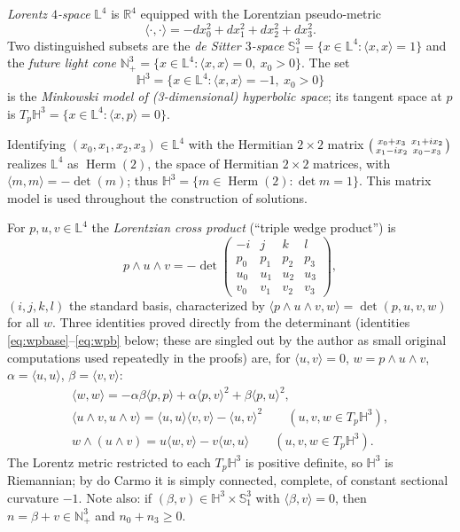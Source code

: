 \documentclass[11pt,a4paper]{article}
\newcommand{\RR}{\mathbb{R}}
\newcommand{\Hyp}{\mathbb{H}^3}                      %
\newcommand{\Lor}{\mathbb{L}^4}                      %
\newcommand{\deS}{\mathbb{S}^3_1}                    %
\newcommand{\LCone}{\mathbb{N}^3_+}                  %
\newcommand{\Herm}{\operatorname{Herm}(2)}
\newcommand{\ip}[2]{\langle #1,#2\rangle}            %
\theoremstyle{plain}
\theoremstyle{definition}
\theoremstyle{remark}
\begin{document}
\emph{Lorentz $4$-space} $\Lor$ is $\RR^4$ equipped with the Lorentzian
pseudo-metric
\begin{equation}
  \ip{\cdot}{\cdot} = -dx_0^2+dx_1^2+dx_2^2+dx_3^2 .
\end{equation}
Two distinguished subsets are the \emph{de Sitter $3$-space}
$\deS=\{x\in\Lor : \ip xx=1\}$ and the \emph{future light cone}
$\LCone=\{x\in\Lor : \ip xx=0,\ x_0>0\}$. The set
\[
  \Hyp = \{x\in\Lor : \ip xx=-1,\ x_0>0\}
\]
is the \emph{Minkowski model of (3-dimensional) hyperbolic space}; its
tangent space at $p$ is $T_p\Hyp=\{x\in\Lor:\ip xp=0\}$.

Identifying $(x_0,x_1,x_2,x_3)\in\Lor$ with the Hermitian $2\times2$ matrix
$\begin{psmallmatrix}x_0+x_3 & x_1+ix_2\\ x_1-ix_2 & x_0-x_3\end{psmallmatrix}$
realizes $\Lor$ as $\Herm$, the space of Hermitian $2\times2$ matrices,
with $\ip mm=-\det(m)$; thus $\Hyp=\{m\in\Herm:\det m=1\}$. This
matrix model is used throughout the construction of solutions.

For $p,u,v\in\Lor$ the \emph{Lorentzian cross product} (``triple wedge
product'') is
\begin{equation}
  p\wedge u\wedge v = -\det\begin{pmatrix} -i&j&k&l\\ p_0&p_1&p_2&p_3\\
  u_0&u_1&u_2&u_3\\ v_0&v_1&v_2&v_3\end{pmatrix},
\end{equation}
$(i,j,k,l)$ the standard basis, characterized by
$\ip{p\wedge u\wedge v}{w}=\det(p,u,v,w)$ for all $w$. Three identities
proved directly from the determinant (identities \eqref{eq:wpbase}--\eqref{eq:wpb}
below; these are singled out by the author as small original computations
used repeatedly in the proofs) are, for $\ip uv=0$, $w=p\wedge u\wedge v$, $\alpha=\ip uu$,
$\beta=\ip vv$:
\begin{gather}
  \ip ww = -\alpha\beta\ip pp + \alpha\ip pv^2+\beta\ip pu^2, \label{eq:wpbase}\\
  \ip{u\wedge v}{u\wedge v} = \ip uu\ip vv - \ip uv^2
    \qquad (u,v,w\in T_p\Hyp), \label{eq:wpa}\\
  w\wedge(u\wedge v) = u\ip wv - v\ip wu \qquad (u,v,w\in T_p\Hyp). \label{eq:wpb}
\end{gather}
The Lorentz metric restricted to each $T_p\Hyp$ is positive definite, so
$\Hyp$ is Riemannian; by do Carmo \cite{CARMO} it is simply connected,
complete, of constant sectional curvature $-1$. Note also: if
$(\beta,v)\in\Hyp\times\deS$ with $\ip\beta v=0$, then $n=\beta+v\in\LCone$
and $n_0+n_3\ge0$.
\end{document}
